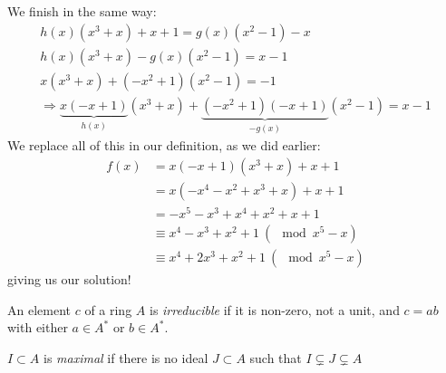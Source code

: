 We finish in the same way: 
\begin{gather*}
  h(x)(x^3 + x) + x + 1 = g(x)(x^2 - 1) - x \\
  h(x)(x^3 + x) - g(x)(x^2 - 1) = x - 1 \\
  x(x^3 + x) + (-x^2 + 1)(x^2 - 1) = -1 \\
  \Rightarrow \underbrace{x(-x + 1)}_{h(x)}(x^3 + x) + \underbrace{(-x^2 + 1)(-x + 1)}_{-g(x)}(x^2 - 1) = x - 1
\end{gather*}
We replace all of this in our definition, as we did earlier: 
\begin{align*}
  f(x) 
  &= x(-x + 1)(x^3 + x) + x + 1 \\
  &= x(-x^4 - x^2 + x^3 + x) + x + 1 \\
  &= -x^5 - x^3 + x^4 + x^2 + x + 1 \\
  &\equiv x^4 - x^3 + x^2 + 1 \ (\mod x^5 - x) \\
  &\equiv x^4 + 2x^3 + x^2 + 1 \ (\mod x^5 - x)
\end{align*}
giving us our solution!


\begin{definition}
  An element $c$ of a ring $A$ is \emph{irreducible} if it is non-zero, not a unit, and $c = ab$ with either $a \in A^*$ or $b \in A^*$. 
\end{definition}

\begin{definition}
  $I \subset A$ is \emph{maximal} if there is no ideal $J \subset A$ such that $I \subsetneq J \subsetneq A$
\end{definition}

